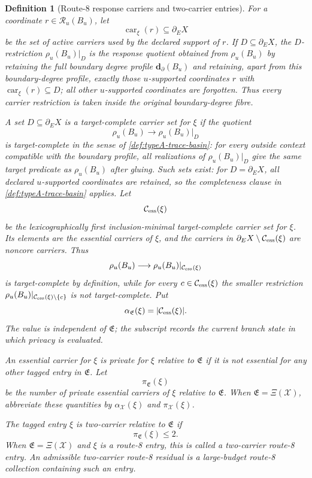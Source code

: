 \documentclass[11pt]{article}
\newtheorem{definition}[theorem]{Definition}
\begin{document}
\begin{definition}[Route-8 response carriers and two-carrier entries]
For a coordinate $r\in\mathcal R_u(B_u)$, let
\[
\operatorname{car}_\xi(r)\subseteq\partial_E X
\]
be the set of active carriers used by the declared support of $r$.  If
$D\subseteq\partial_E X$, the \emph{$D$-restriction}
$\rho_u(B_u)|_D$ is the response quotient obtained from $\rho_u(B_u)$ by
retaining the full boundary degree profile $\mathbf d_\partial(B_u)$ and
retaining, apart from this boundary-degree profile, exactly those
$u$-supported coordinates $r$ with
$\operatorname{car}_\xi(r)\subseteq D$; all other $u$-supported coordinates are
forgotten.  Thus every carrier restriction is taken inside the original
boundary-degree fibre.

A set $D\subseteq\partial_E X$ is a \emph{target-complete carrier set for
$\xi$} if the quotient
\[
\rho_u(B_u)\longrightarrow \rho_u(B_u)|_D
\]
is target-complete in the sense of \cref{def:typeA-trace-basin}: for every
outside context compatible with the boundary profile, all realizations of
$\rho_u(B_u)|_D$ give the same target predicate as $\rho_u(B_u)$ after gluing.
Such sets exist: for $D=\partial_E X$, all declared $u$-supported coordinates
are retained, so the completeness clause in \cref{def:typeA-trace-basin}
applies.  Let
\[
\mathcal C_{\rm ess}(\xi)
\]
be the lexicographically first inclusion-minimal target-complete carrier set for
$\xi$.  Its elements are the \emph{essential carriers} of $\xi$, and the
carriers in $\partial_E X\setminus\mathcal C_{\rm ess}(\xi)$ are
\emph{noncore carriers}.  Thus
\[
\rho_u(B_u)\longrightarrow
\rho_u(B_u)|_{\mathcal C_{\rm ess}(\xi)}
\]
is target-complete by definition, while for every
$c\in\mathcal C_{\rm ess}(\xi)$ the smaller restriction
$\rho_u(B_u)|_{\mathcal C_{\rm ess}(\xi)\setminus\{c\}}$ is not
target-complete.  Put
\[
\alpha_{\mathfrak E}(\xi)=|\mathcal C_{\rm ess}(\xi)|.
\]
The value is independent of \(\mathfrak E\); the subscript records the current
branch state in which privacy is evaluated.

An essential carrier for $\xi$ is \emph{private for $\xi$ relative to
\(\mathfrak E\)} if it is not essential for any other tagged entry in
\(\mathfrak E\).  Let
\[
\pi_{\mathfrak E}(\xi)
\]
be the number of private essential carriers of $\xi$ relative to
\(\mathfrak E\).  When \(\mathfrak E=\Xi(\mathcal X)\), abbreviate these
quantities by \(\alpha_{\mathcal X}(\xi)\) and
\(\pi_{\mathcal X}(\xi)\).

The tagged entry $\xi$ is \emph{two-carrier relative to \(\mathfrak E\)} if
\[
\pi_{\mathfrak E}(\xi)\le2.
\]
When \(\mathfrak E=\Xi(\mathcal X)\) and \(\xi\) is a route-8 entry, this is
called a \emph{two-carrier route-8 entry}.
	An admissible \emph{two-carrier route-8 residual} is a large-budget route-8
	collection containing such an entry.
	\end{definition}
\end{document}
